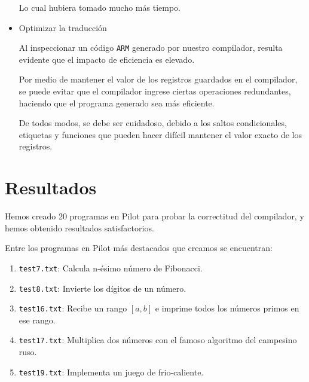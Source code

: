 \documentclass[12pt,spanish]{article}
\begin{document}
\begin{itemize}
Lo cual hubiera tomado mucho más tiempo.

\item{Optimizar la traducción}

Al inspeccionar un código \texttt{ARM} generado por nuestro compilador, resulta evidente que el impacto de eficiencia es elevado.

Por medio de mantener el valor de los registros guardados en el compilador, se puede evitar que el compilador ingrese ciertas operaciones redundantes, haciendo que el programa generado sea más eficiente.

De todos modos, se debe ser cuidadoso, debido a los saltos condicionales, etiquetas y funciones que pueden hacer difícil mantener el valor exacto de los registros.

\end{itemize}

\section{Resultados}
Hemos creado 20 programas en Pilot para probar la correctitud del compilador, y hemos obtenido resultados satisfactorios.

\noindent
Entre los programas en Pilot más destacados que creamos se encuentran:
\begin{enumerate}
\item{\texttt{test7.txt}: Calcula n-ésimo número de Fibonacci.}
\item{\texttt{test8.txt}: Invierte los dígitos de un número.}
\item{\texttt{test16.txt}: Recibe un rango $[a, b]$ e imprime todos los números primos en ese rango.}
\item{\texttt{test17.txt}: Multiplica dos números con el famoso algoritmo del campesino ruso.}
\item{\texttt{test19.txt}: Implementa un juego de frio-caliente.}
\end{enumerate}
 
\end{document}
